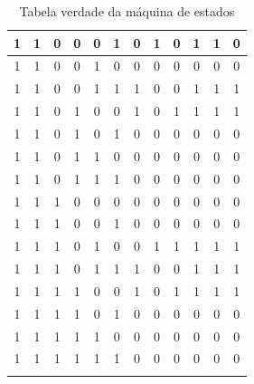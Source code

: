 \documentclass[12pt,a4paper]{article}
\begin{document}
\begin{longtable}{|ccc|ccc||ccc|c|c|c|}
1 & 1 & 0 & 0 & 0 & 1 & 0 & 1 & 0 & 1 & 1 & 0 \\ \hline
1 & 1 & 0 & 0 & 1 & 0 & 0 & 0 & 0 & 0 & 0 & 0 \\ \hline
1 & 1 & 0 & 0 & 1 & 1 & 1 & 0 & 0 & 1 & 1 & 1 \\ \hline
1 & 1 & 0 & 1 & 0 & 0 & 1 & 0 & 1 & 1 & 1 & 1 \\ \hline
1 & 1 & 0 & 1 & 0 & 1 & 0 & 0 & 0 & 0 & 0 & 0 \\ \hline
1 & 1 & 0 & 1 & 1 & 0 & 0 & 0 & 0 & 0 & 0 & 0 \\ \hline
1 & 1 & 0 & 1 & 1 & 1 & 0 & 0 & 0 & 0 & 0 & 0 \\ \hline
1 & 1 & 1 & 0 & 0 & 0 & 0 & 0 & 0 & 0 & 0 & 0 \\ \hline
1 & 1 & 1 & 0 & 0 & 1 & 0 & 0 & 0 & 0 & 0 & 0 \\ \hline
1 & 1 & 1 & 0 & 1 & 0 & 0 & 1 & 1 & 1 & 1 & 1 \\ \hline
1 & 1 & 1 & 0 & 1 & 1 & 1 & 0 & 0 & 1 & 1 & 1 \\ \hline
1 & 1 & 1 & 1 & 0 & 0 & 1 & 0 & 1 & 1 & 1 & 1 \\ \hline
1 & 1 & 1 & 1 & 0 & 1 & 0 & 0 & 0 & 0 & 0 & 0 \\ \hline
1 & 1 & 1 & 1 & 1 & 0 & 0 & 0 & 0 & 0 & 0 & 0 \\ \hline
1 & 1 & 1 & 1 & 1 & 1 & 0 & 0 & 0 & 0 & 0 & 0 \\ \hline

\caption{Tabela verdade da máquina de estados}
\label{tabV}
\end{longtable}
\end{document}
